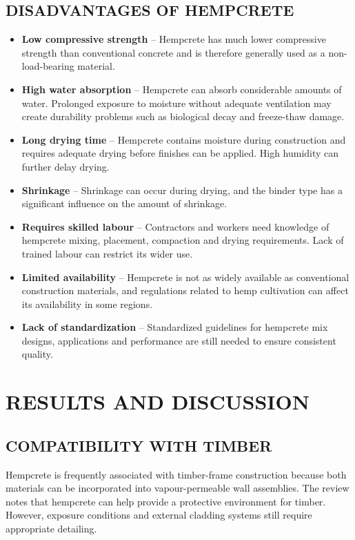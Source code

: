 \documentclass[12pt,a4paper,final]{report}
\begin{document}
\section[Disadvantages of Hempcrete]{DISADVANTAGES OF HEMPCRETE}
\begin{itemize}[label=\textbullet,leftmargin=2.4em,itemsep=4pt,topsep=3pt,parsep=0pt]
\item \textbf{Low compressive strength} -- Hempcrete has much lower compressive strength than conventional concrete and is therefore generally used as a non-load-bearing material.
\item \textbf{High water absorption} -- Hempcrete can absorb considerable amounts of water. Prolonged exposure to moisture without adequate ventilation may create durability problems such as biological decay and freeze-thaw damage.
\item \textbf{Long drying time} -- Hempcrete contains moisture during construction and requires adequate drying before finishes can be applied. High humidity can further delay drying.
\item \textbf{Shrinkage} -- Shrinkage can occur during drying, and the binder type has a significant influence on the amount of shrinkage.
\item \textbf{Requires skilled labour} -- Contractors and workers need knowledge of hempcrete mixing, placement, compaction and drying requirements. Lack of trained labour can restrict its wider use.
\item \textbf{Limited availability} -- Hempcrete is not as widely available as conventional construction materials, and regulations related to hemp cultivation can affect its availability in some regions.
\item \textbf{Lack of standardization} -- Standardized guidelines for hempcrete mix designs, applications and performance are still needed to ensure consistent quality.
\end{itemize}

\chapter{RESULTS AND DISCUSSION}

\section[Compatibility with Timber]{COMPATIBILITY WITH TIMBER}
Hempcrete is frequently associated with timber-frame construction because both materials can
be incorporated into vapour-permeable wall assemblies. The review notes that hempcrete can
help provide a protective environment for timber. However, exposure conditions and external
cladding systems still require appropriate detailing.
\end{document}
